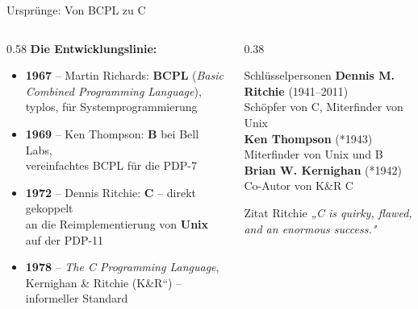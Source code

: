 \documentclass[%
  aspectratio=169,
  10pt
]{beamer}
\newcommand{\enquote}[1]{\quotedblbase{}#1\textquotedblleft{}}
\begin{document}
\begin{frame}{Ursprünge: Von BCPL zu C}
  \begin{columns}[T]
    \begin{column}{0.58\textwidth}
      \textbf{Die Entwicklungslinie:}
      \begin{itemize}
        \item \textbf{1967} -- Martin Richards: \textbf{BCPL}
              (\emph{Basic Combined Programming Language}),\\
              typlos, für Systemprogrammierung
        \item \textbf{1969} -- Ken Thompson: \textbf{B} bei Bell Labs,\\
              vereinfachtes BCPL für die PDP-7
        \item \textbf{1972} -- Dennis Ritchie: \textbf{C} -- direkt gekoppelt\\
              an die Reimplementierung von \textbf{Unix} auf der PDP-11
        \item \textbf{1978} -- \emph{The C Programming Language},\\
              Kernighan \& Ritchie (\enquote{K\&R}) -- informeller Standard
      \end{itemize}
    \end{column}
    \begin{column}{0.38\textwidth}
      \begin{block}{Schlüsselpersonen}
        \textbf{Dennis M. Ritchie} (1941--2011)\\
        Schöpfer von C, Miterfinder von Unix\\[0.3em]
        \textbf{Ken Thompson} (*1943)\\
        Miterfinder von Unix und B\\[0.3em]
        \textbf{Brian W. Kernighan} (*1942)\\
        Co-Autor von K\&R C
      \end{block}
      \begin{alertblock}{Zitat Ritchie}
        \emph{„C is quirky, flawed, and an enormous success."}
      \end{alertblock}
    \end{column}
  \end{columns}

  \vspace{0.4em}
\end{frame}
\end{document}
